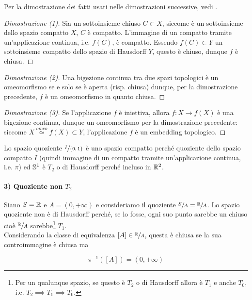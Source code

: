 Per la dimostrazione dei fatti usati nelle dimostrazioni successive, vedi \cite{Loi}.

\begin{proof}[Dimostrazione (1)]
	Sia un sottoinsieme chiuso $ C \subset X $, siccome è un sottoinsieme dello spazio compatto $ X $, $ C $ è compatto. L'immagine di un compatto tramite un'applicazione continua, i.e. $ f(C) $, è compatto. Essendo $ f(C) \subset Y $ un sottoinsieme compatto dello spazio di Hausdorff $ Y $, questo è chiuso, dunque $ f $ è chiusa.
\end{proof}

\begin{proof}[Dimostrazione (2)]
	Una bigezione continua tra due spazi topologici è un omeomorfismo se e solo se è aperta (risp. chiusa) dunque, per la dimostrazione precedente, $ f $ è un omeomorfismo in quanto chiusa.
\end{proof}

\begin{proof}[Dimostrazione (3)]
	Se l'applicazione $ f $ è iniettiva, allora $ f : X \to f(X) $ è una bigezione continua, dunque un omeomorfismo per la dimostrazione precedente: siccome $ X \stackrel{omeo}{\simeq} f(X) \subset Y $, l'applicazione $ f $ è un embedding topologico.
\end{proof}

Lo spazio quoziente $ \sfrac{I}{\{0,1\}} $ è uno spazio compatto perché quoziente dello spazio compatto $ I $ (quindi immagine di un compatto tramite un'applicazione continua, i.e. $ \pi $) ed $ \S^{1} $ è $ T_{2} $ o di Hausdorff perché incluso in $ \R^{2} $.

\paragraph{3) Quoziente non $ T_{2} $}

Siano $ S = \R $ e $ A = (0,+\infty) $ e consideriamo il quoziente $ \sfrac{S}{A} = \sfrac{\R}{A} $. Lo spazio quoziente non è di Hausdorff perché, se lo fosse, ogni suo punto sarebbe un chiuso cioè $ \sfrac{\R}{A} $ sarebbe\footnote{%
	Per un qualunque spazio, se questo è $ T_{2} $ o di Hausdorff allora è $ T_{1} $ e anche $ T_{0} $, i.e. $ T_{2} \implies T_{1} \implies T_{0} $.%
} $ T_{1} $. \\
Considerando la classe di equivalenza $ [A] \in \sfrac{\R}{A} $, questa è chiusa se la sua controimmagine è chiusa ma

\begin{equation}
	\pi^{-1} ([A]) = (0,+\infty)
\end{equation}

